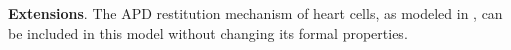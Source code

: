 \textbf{Extensions}. 
The APD restitution mechanism of heart cells, as modeled in \cite{Spector11_Emergence}, can be included in this model without changing its formal properties. 
%
%


